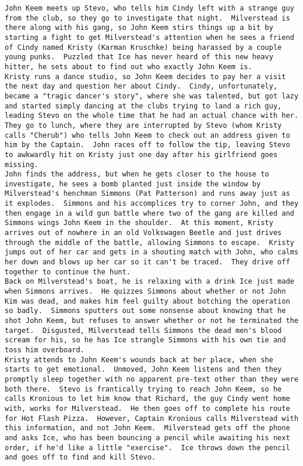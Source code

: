 \documentclass[11pt]{article}
\begin{document}
\begin{Verbatim}[commandchars=\\\{\}]
John Keem meets up Stevo, who tells him Cindy left with a strange guy from the club, so they go to investigate that night.  Milverstead is there along with his gang, so John Keem stirs things up a bit by starting a fight to get Milverstead's attention when he sees a friend of Cindy named Kristy (Karman Kruschke) being harassed by a couple young punks.  Puzzled that Ice has never heard of this new heavy hitter, he sets about to find out who exactly John Keem is.
Kristy runs a dance studio, so John Keem decides to pay her a visit the next day and question her about Cindy.  Cindy, unfortunately, became a "tragic dancer's story", where she was talented, but got lazy and started simply dancing at the clubs trying to land a rich guy, leading Stevo on the whole time that he had an actual chance with her.  They go to lunch, where they are interrupted by Stevo (whom Kristy calls "Cherub") who tells John Keem to check out an address given to him by the Captain.  John races off to follow the tip, leaving Stevo to awkwardly hit on Kristy just one day after his girlfriend goes missing.
John finds the address, but when he gets closer to the house to investigate, he sees a bomb planted just inside the window by Milverstead's henchman Simmons (Pat Patterson) and runs away just as it explodes.  Simmons and his accomplices try to corner John, and they then engage in a wild gun battle where two of the gang are killed and Simmons wings John Keem in the shoulder.  At this moment, Kristy arrives out of nowhere in an old Volkswagen Beetle and just drives through the middle of the battle, allowing Simmons to escape.  Kristy jumps out of her car and gets in a shouting match with John, who calms her down and blows up her car so it can't be traced.  They drive off together to continue the hunt.
Back on Milverstead's boat, he is relaxing with a drink Ice just made when Simmons arrives.  He quizzes Simmons about whether or not John Kim was dead, and makes him feel guilty about botching the operation so badly.  Simmons sputters out some nonsense about knowing that he shot John Keem, but refuses to answer whether or not he terminated the target.  Disgusted, Milverstead tells Simmons the dead men's blood scream for his, so he has Ice strangle Simmons with his own tie and toss him overboard.
Kristy attends to John Keem's wounds back at her place, when she starts to get emotional.  Unmoved, John Keem listens and then they promptly sleep together with no apparent pre-text other than they were both there.  Stevo is frantically trying to reach John Keem, so he calls Kronious to let him know that Richard, the guy Cindy went home with, works for Milverstead.  He then goes off to complete his route for Hot Flash Pizza.  However, Captain Kronious calls Milverstead with this information, and not John Keem.  Milverstead gets off the phone and asks Ice, who has been bouncing a pencil while awaiting his next order, if he'd like a little "exercise".  Ice throws down the pencil and goes off to find and kill Stevo.

\end{Verbatim}
\end{document}
